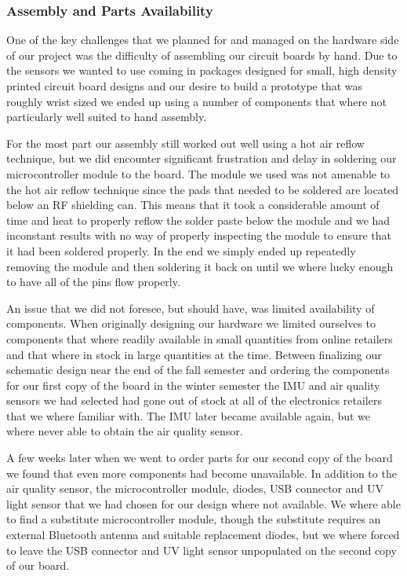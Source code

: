 \subsubsection{Assembly and Parts Availability}

One of the key challenges that we planned for and managed on the hardware side
of our project was the difficulty of assembling our circuit boards by hand. Due
to the sensors we wanted to use coming in packages designed for small, high
density printed circuit board designs and our desire to build a prototype that
was roughly wrist sized we ended up using a number of components that where not
particularly well suited to hand assembly.

For the most part our assembly still worked out well using a hot air reflow
technique, but we did encounter significant frustration and delay in soldering
our microcontroller module to the board. The module we used was not amenable to
the hot air reflow technique since the pads that needed to be soldered are
located below an RF shielding can. This means that it took a considerable amount
of time and heat to properly reflow the solder paste below the module and we had
inconstant results with no way of properly inspecting the module to ensure that
it had been soldered properly. In the end we simply ended up repeatedly removing
the module and then soldering it back on until we where lucky enough to have all
of the pins flow properly.

An issue that we did not foresee, but should have, was limited availability of
components. When originally designing our hardware we limited ourselves to
components that where readily available in small quantities from online
retailers and that where in stock in large quantities at the time. Between
finalizing our schematic design near the end of the fall semester and ordering
the components for our first copy of the board in the winter semester the IMU
and air quality sensors we had selected had gone out of stock at all of the
electronics retailers that we where familiar with. The IMU later became
available again, but we where never able to obtain the air quality sensor.

A few weeks later when we went to order parts for our second copy of the board
we found that even more components had become unavailable. In addition to the
air quality sensor, the microcontroller module, diodes, USB connector and UV
light sensor that we had chosen for our design where not available. We where
able to find a substitute microcontroller module, though the substitute requires
an external Bluetooth antenna and suitable replacement diodes, but we where
forced to leave the USB connector and UV light sensor unpopulated on the second
copy of our board.


